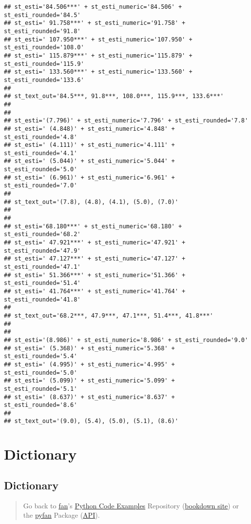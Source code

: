 \documentclass[
]{book}
\begin{document}
\begin{verbatim}
## st_esti='84.506***' + st_esti_numeric='84.506' + st_esti_rounded='84.5'
## st_esti=' 91.758***' + st_esti_numeric='91.758' + st_esti_rounded='91.8'
## st_esti=' 107.950***' + st_esti_numeric='107.950' + st_esti_rounded='108.0'
## st_esti=' 115.879***' + st_esti_numeric='115.879' + st_esti_rounded='115.9'
## st_esti=' 133.560***' + st_esti_numeric='133.560' + st_esti_rounded='133.6'
## 
## st_text_out='84.5***, 91.8***, 108.0***, 115.9***, 133.6***'
## 
## 
## st_esti='(7.796)' + st_esti_numeric='7.796' + st_esti_rounded='7.8'
## st_esti=' (4.848)' + st_esti_numeric='4.848' + st_esti_rounded='4.8'
## st_esti=' (4.111)' + st_esti_numeric='4.111' + st_esti_rounded='4.1'
## st_esti=' (5.044)' + st_esti_numeric='5.044' + st_esti_rounded='5.0'
## st_esti=' (6.961)' + st_esti_numeric='6.961' + st_esti_rounded='7.0'
## 
## st_text_out='(7.8), (4.8), (4.1), (5.0), (7.0)'
## 
## 
## st_esti='68.180***' + st_esti_numeric='68.180' + st_esti_rounded='68.2'
## st_esti=' 47.921***' + st_esti_numeric='47.921' + st_esti_rounded='47.9'
## st_esti=' 47.127***' + st_esti_numeric='47.127' + st_esti_rounded='47.1'
## st_esti=' 51.366***' + st_esti_numeric='51.366' + st_esti_rounded='51.4'
## st_esti=' 41.764***' + st_esti_numeric='41.764' + st_esti_rounded='41.8'
## 
## st_text_out='68.2***, 47.9***, 47.1***, 51.4***, 41.8***'
## 
## 
## st_esti='(8.986)' + st_esti_numeric='8.986' + st_esti_rounded='9.0'
## st_esti=' (5.368)' + st_esti_numeric='5.368' + st_esti_rounded='5.4'
## st_esti=' (4.995)' + st_esti_numeric='4.995' + st_esti_rounded='5.0'
## st_esti=' (5.099)' + st_esti_numeric='5.099' + st_esti_rounded='5.1'
## st_esti=' (8.637)' + st_esti_numeric='8.637' + st_esti_rounded='8.6'
## 
## st_text_out='(9.0), (5.4), (5.0), (5.1), (8.6)'
\end{verbatim}

\hypertarget{dictionary}{%
\section{Dictionary}\label{dictionary}}

\hypertarget{dictionary-1}{%
\subsection{Dictionary}\label{dictionary-1}}

\begin{quote}
Go back to \href{http://fanwangecon.github.io/}{fan}'s \href{https://fanwangecon.github.io/Py4Econ/}{Python Code Examples} Repository (\href{https://fanwangecon.github.io/Py4Econ/bookdown}{bookdown site}) or the \href{https://pyfan.readthedocs.io/en/latest/}{pyfan} Package (\href{https://pyfan.readthedocs.io/en/latest/reference.html}{API}).
\end{quote}
\end{document}

